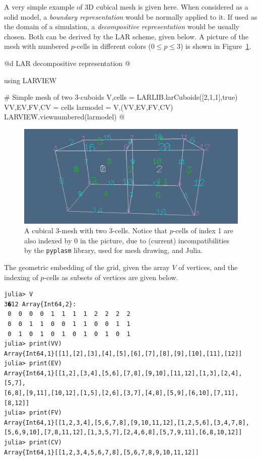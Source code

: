 \begin{example}

A very simple example of 3D cubical mesh is given here. When considered as a solid model,  a \emph{boundary representation} would be normally applied to it. If used as the domain of a simulation, a \emph{decompositive representation} would be usually chosen. Both can be derived by the LAR scheme, given below. A picture of the mesh with numbered $p$-cells in different colors ($0\leq p\leq 3$) is shown in Figure~\ref{fig:intro-1}.

@d LAR decompositive representation 
@{using LARVIEW

# Simple mesh of two 3-cuboids
V,cells = LARLIB.larCuboids([2,1,1],true)
VV,EV,FV,CV = cells
larmodel = V,(VV,EV,FV,CV)
LARVIEW.viewnumbered(larmodel)
@}

\begin{figure}[htbp] %
   \centering
   \includegraphics[width=\textwidth]{img/intro-1.pdf} 
   \caption{A cubical 3-mesh with two 3-cells. Notice that $p$-cells of index 1 are also indexed by 0 in the picture, due to (current) incompatibilities by the \texttt{pyplasm} library, used for mesh drawing, and Julia.}
   \label{fig:intro-1}
\end{figure}

The geometric embedding of the grid, given the array $V$ of vertices, and the indexing of $p$-cells as subsets of vertices are given below.

{\small\begin{verbatim}
julia> V
3�12 Array{Int64,2}:
 0  0  0  0  1  1  1  1  2  2  2  2
 0  0  1  1  0  0  1  1  0  0  1  1
 0  1  0  1  0  1  0  1  0  1  0  1
julia> print(VV)
Array{Int64,1}[[1],[2],[3],[4],[5],[6],[7],[8],[9],[10],[11],[12]]
julia> print(EV)
Array{Int64,1}[[1,2],[3,4],[5,6],[7,8],[9,10],[11,12],[1,3],[2,4],[5,7],
[6,8],[9,11],[10,12],[1,5],[2,6],[3,7],[4,8],[5,9],[6,10],[7,11],[8,12]]
julia> print(FV)
Array{Int64,1}[[1,2,3,4],[5,6,7,8],[9,10,11,12],[1,2,5,6],[3,4,7,8],
[5,6,9,10],[7,8,11,12],[1,3,5,7],[2,4,6,8],[5,7,9,11],[6,8,10,12]]
julia> print(CV)
Array{Int64,1}[[1,2,3,4,5,6,7,8],[5,6,7,8,9,10,11,12]]
\end{verbatim}
}
\end{example}

